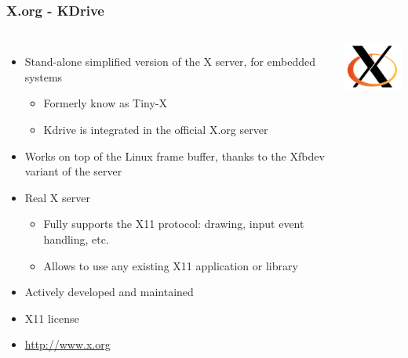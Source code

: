 \begin{frame}
  \frametitle{X.org - KDrive}
  \begin{columns}[T]
    \begin{itemize}
    \item Stand-alone simplified version of the X server, for embedded
      systems
      \begin{itemize}
      \item Formerly know as Tiny-X
      \item Kdrive is integrated in the official X.org server
      \end{itemize}
    \item Works on top of the Linux frame buffer, thanks to the Xfbdev
      variant of the server
    \item Real X server
      \begin{itemize}
      \item Fully supports the X11 protocol: drawing, input event
        handling, etc.
      \item Allows to use any existing X11 application or library
      \end{itemize}
    \item Actively developed and maintained
    \item X11 license
    \item \url{http://www.x.org}
    \end{itemize}
    \includegraphics[width=\textwidth]{slides/sysdev-embedded-linux/xorg.png}
  \end{columns}
\end{frame}


